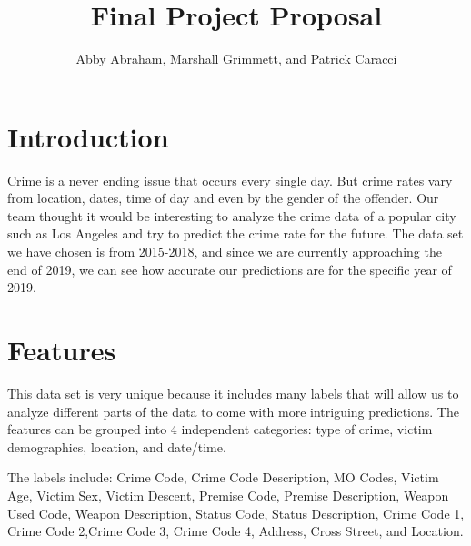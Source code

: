\documentclass{article}
\title{Final Project Proposal}
\author{Abby Abraham, Marshall Grimmett, and Patrick Caracci}
\begin{document}
\maketitle

\section{Introduction}
Crime is a never ending issue that occurs every single day. But crime rates vary from location, dates, time of day and even by the gender of the offender. Our team thought it would be interesting to analyze the crime data of a popular city such as Los Angeles and try to predict the crime rate for the future. The data set we have chosen is from 2015-2018, and since we are currently approaching the end of 2019, we can see how accurate our predictions are for the specific year of 2019.

\section{Features}
This data set is very unique because it includes many labels that will allow us to analyze different parts of the data to come with more intriguing predictions. The features can be grouped into 4 independent categories: type of crime, victim demographics, location, and date/time.

The labels include: Crime Code, Crime Code Description, MO Codes, Victim Age, Victim Sex, Victim Descent, Premise Code, Premise Description, Weapon Used Code, Weapon Description, Status Code, Status Description, Crime Code 1, Crime Code 2,Crime Code 3, Crime Code 4, Address, Cross Street, and Location.

\end{document}
